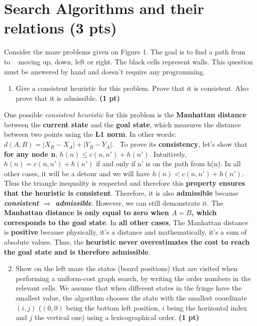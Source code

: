 \documentclass[11pt,a4paper]{report}
\begin{document}
\maketitle

\section{Search Algorithms and their relations (3 pts)}
Consider the maze problems given on Figure 1. The goal is to find a path from \Gentsroom ~ to \EURhv ~ moving up, down, left or right. The black cells represent walls. This question must be answered by hand and doesn't require any programming.

\begin{enumerate}
\item Give a consistent heuristic for this problem. Prove that it is consistent. Also prove that it is admissible. \textbf{(1 pt)}
\end{enumerate}

\begin{answers}[4cm]
\small{One possible \textit{consistent heuristic} for this problem is the \textbf{Manhattan distance} between the \textbf{current state} and the \textbf{goal state}, which measures the distance between two points using the \textbf{L1 norm}. In other words: \\ \textbf{$d(A, B) = \lvert X_B - X_A \rvert + \lvert Y_B - Y_A \rvert$}. \
To prove its \textbf{consistency}, let's show that \textbf{for any node n}, $h(n)\leq c(n, n') + h(n')$. Intuitively, $h(n) = c(n, n') + h(n')$ if and only if n' is on the path from h(n). In all other cases, it will be a detour and we will have $h(n) < c(n, n') + h(n')$. Thus the triangle inequality is respected and therefore this \textbf{property ensures that the heuristic is consistent}. Therefore, it is also \textbf{admissible} because \textbf{\textit{consistent $\Rightarrow$ admissible}}. However, we can still demonstrate it. The \textbf{Manhattan distance is only equal to zero when $A = B$, which corresponds to the goal state}. In \textbf{all other cases}, The Manhattan distance is \textbf{positive} because physically, it's a distance and mathematically, it's a sum of absolute values. Thus, the \textbf{heuristic never overestimates the cost to reach the goal state and is therefore admissible}.}
\end{answers}



\begin{enumerate}
\setcounter{enumi}{1}
\item Show on the left maze the states (board positions) that
are visited when performing a uniform-cost graph search, by writing the order numbers in the relevant cells. We assume that when different states in the fringe have the smallest value, the algorithm chooses the state with the smallest coordinate $(i,j)$ ($(0,0)$ being the bottom left position, $i$ being the horizontal index and $j$ the vertical one) using a lexicographical order. \textbf{(1 pt)}
\end{enumerate}
\end{document}
